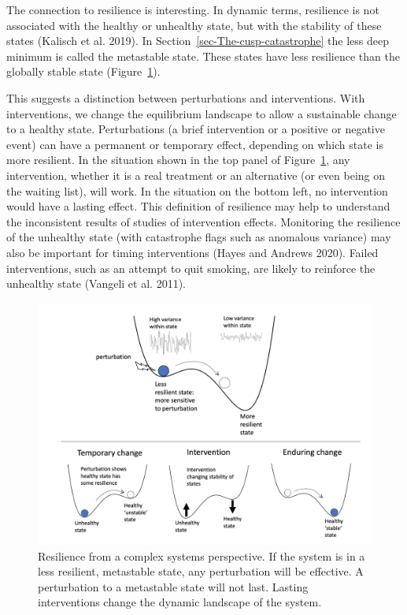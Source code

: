 \documentclass[
  a4paper,
  DIV=11,
  numbers=noendperiod,
  oneside]{scrreprt}
\begin{document}
The connection to resilience is interesting. In dynamic terms,
resilience is not associated with the healthy or unhealthy state, but
with the stability of these states (Kalisch et al. 2019). In
Section~\ref{sec-The-cusp-catastrophe} the less deep minimum is called
the metastable state. These states have less resilience than the
globally stable state (Figure~\ref{fig-ch6-img10-old-79}).

This suggests a distinction between perturbations and interventions.
With interventions, we change the equilibrium landscape to allow a
sustainable change to a healthy state. Perturbations (a brief
intervention or a positive or negative event) can have a permanent or
temporary effect, depending on which state is more resilient. In the
situation shown in the top panel of Figure~\ref{fig-ch6-img10-old-79},
any intervention, whether it is a real treatment or an alternative (or
even being on the waiting list), will work. In the situation on the
bottom left, no intervention would have a lasting effect. This
definition of resilience may help to understand the inconsistent results
of studies of intervention effects. Monitoring the resilience of the
unhealthy state (with catastrophe flags such as anomalous variance) may
also be important for timing interventions (Hayes and Andrews 2020).
Failed interventions, such as an attempt to quit smoking, are likely to
reinforce the unhealthy state (Vangeli et al. 2011).

\begin{figure}

{\centering \includegraphics{media/ch6/image10.jpg}

}

\caption{\label{fig-ch6-img10-old-79}Resilience from a complex systems
perspective. If the system is in a less resilient, metastable state, any
perturbation will be effective. A perturbation to a metastable state
will not last. Lasting interventions change the dynamic landscape of the
system.}

\end{figure}
\end{document}
